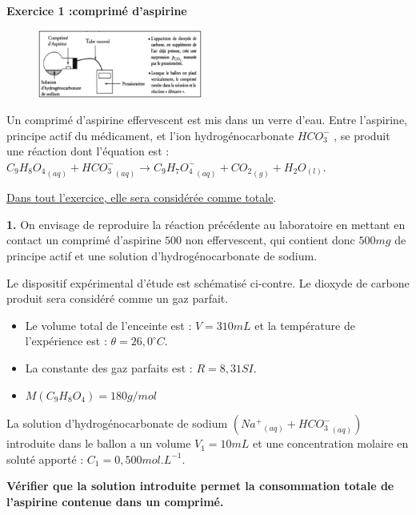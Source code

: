 \documentclass[12pt, french]{article}
\begin{document}
\begin{Box2}{\textbf{Exercice 1 :comprimé d'aspirine}}
\begin{figure}
  \begin{center}
	  \vspace{-1cm}
	\includegraphics[width=0.48\textwidth]{./img/ex01_1.png}
  \end{center}
\end{figure}

	Un comprimé d'aspirine effervescent est mis dans un verre d'eau. Entre l'aspirine, principe actif du
médicament, et l'ion hydrogénocarbonate $HCO_3^-$ , se produit une réaction dont l'équation est :
${C_9H_8O_4}_{(aq)} + {HCO_3^-}_{(aq)} \rightarrow {C_9H_7O_4^-}_{(aq)} + {CO_2}_{(g)} + H_2O_{(l)}$.

\underline{Dans tout l'exercice, elle sera considérée comme totale}.

\textbf{1. }On envisage de reproduire la réaction
précédente au laboratoire en mettant
en contact un comprimé d'aspirine $500$
non effervescent, qui contient donc
$500mg$ de principe actif et une solution
d'hydrogénocarbonate de sodium.

Le dispositif expérimental d’étude est
schématisé ci-contre. Le dioxyde de
carbone produit sera considéré comme un gaz parfait.

\begin{itemize}

	\item Le volume total de l’enceinte est : $V= 310 mL$ et la température de l’expérience est : $\theta=26,0^{\circ}C$.
	\item La constante des gaz parfaits est : $R = 8,31 SI$.
	\item  $M(C_9H_8O_4)=180g/mol$
\end{itemize}
La solution d'hydrogénocarbonate de sodium $({Na^+}_{(aq)}+ {HCO_3^-}_{(aq)})$ introduite dans le ballon a un volume
$V_1=10mL$ et une concentration molaire en soluté apporté : $C_1=0,500 mol.L^{-1}$.

\textbf{Vérifier que la solution introduite permet la
consommation totale de l'aspirine contenue dans
un comprimé.}


\end{Box2}
\end{document}
